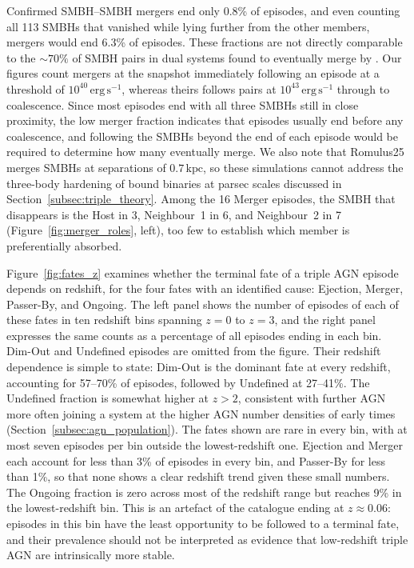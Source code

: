 \documentclass[twocolumn, 10pt]{article}
\begin{document}
Confirmed SMBH--SMBH mergers end only 0.8\% of episodes, and even counting all 113 SMBHs that vanished while lying further from the other members, mergers would end 6.3\% of episodes. These fractions are not directly comparable to the $\sim 70\%$ of SMBH pairs in dual systems found to eventually merge by \citet{Saeedzadeh2024}. Our figures count mergers at the snapshot immediately following an episode at a threshold of $10^{40}\,\mathrm{erg\,s^{-1}}$, whereas theirs follows pairs at $10^{43}\,\mathrm{erg\,s^{-1}}$ through to coalescence. Since most episodes end with all three SMBHs still in close proximity, the low merger fraction indicates that episodes usually end before any coalescence, and following the SMBHs beyond the end of each episode would be required to determine how many eventually merge. We also note that Romulus25 merges SMBHs at separations of $0.7\,\mathrm{kpc}$, so these simulations cannot address the three-body hardening of bound binaries at parsec scales discussed in Section~\ref{subsec:triple_theory}. Among the 16 Merger episodes, the SMBH that disappears is the Host in 3, Neighbour~1 in 6, and Neighbour~2 in 7 (Figure~\ref{fig:merger_roles}, left), too few to establish which member is preferentially absorbed.

Figure~\ref{fig:fates_z} examines whether the terminal fate of a triple AGN episode depends on redshift, for the four fates with an identified cause: Ejection, Merger, Passer-By, and Ongoing. The left panel shows the number of episodes of each of these fates in ten redshift bins spanning $z = 0$ to $z = 3$, and the right panel expresses the same counts as a percentage of all episodes ending in each bin. Dim-Out and Undefined episodes are omitted from the figure. Their redshift dependence is simple to state: Dim-Out is the dominant fate at every redshift, accounting for 57--70\% of episodes, followed by Undefined at 27--41\%. The Undefined fraction is somewhat higher at $z > 2$, consistent with further AGN more often joining a system at the higher AGN number densities of early times (Section~\ref{subsec:agn_population}). The fates shown are rare in every bin, with at most seven episodes per bin outside the lowest-redshift one. Ejection and Merger each account for less than 3\% of episodes in every bin, and Passer-By for less than 1\%, so that none shows a clear redshift trend given these small numbers. The Ongoing fraction is zero across most of the redshift range but reaches 9\% in the lowest-redshift bin. This is an artefact of the catalogue ending at $z \approx 0.06$: episodes in this bin have the least opportunity to be followed to a terminal fate, and their prevalence should not be interpreted as evidence that low-redshift triple AGN are intrinsically more stable.
\end{document}
